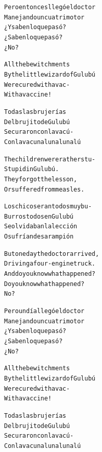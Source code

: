 \documentclass[11pt,a4paper]{article}
\begin{document}
\begin{parcolumns}{2}
\colchunk
{
\begin{alltt}\normalfont
Pero entonces llegó el doctor
Manejando un cuatrimotor
¿Y saben lo que pasó?
¿Saben lo que pasó?
¿No?
\end{alltt}
}

\colplacechunks

\colchunk
{
\begin{alltt}\normalfont
All the bewitchments
By the little wizard of Gulubú
Were cured with a vac-
With a vaccine!
\end{alltt}
}

\colchunk
{
\begin{alltt}\normalfont
Todas las brujerías
Del brujito de Gulubú
Se curaron con la vacú-
Con la vacuna luna luna lú
\end{alltt}
}

\colplacechunks

\colchunk
{
\begin{alltt}\normalfont
The children were rather stu-
Stupid in Gulubú.
They forgot the lesson,
Or suffered from measles.
\end{alltt}
}

\colchunk
{
\begin{alltt}\normalfont
Los chicos eran todos muy bu-
Burros todos en Gulubú
Se olvidaban la lección
O sufrían de sarampión
\end{alltt}
}

\colplacechunks

\colchunk
{
\begin{alltt}\normalfont
But one day the doctor arrived,
Driving a four-engine truck.
And do you know what happened?
Do you know what happened?
No?
\end{alltt}
}

\colchunk
{
\begin{alltt}\normalfont
Pero un día llegó el doctor
Manejando un cuatrimotor
¿Y saben lo que pasó?
¿Saben lo que pasó?
¿No?
\end{alltt}
}

\colplacechunks

\colchunk
{
\begin{alltt}\normalfont
All the bewitchments
By the little wizard of Gulubú
Were cured with a vac-
With a vaccine!
\end{alltt}
}

\colchunk
{
\begin{alltt}\normalfont
Todas las brujerías
Del brujito de Gulubú
Se curaron con la vacú-
Con la vacuna luna luna lú
\end{alltt}
}


\end{parcolumns}
\end{document}
